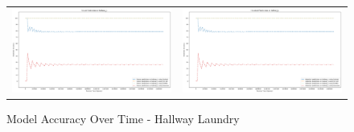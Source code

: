 \begin{figure}
  \begin{tabular}{cc}
    {\includegraphics[width = 3in]{images/results/Future_Predictions_on_hallway_L.png}} &
    {\includegraphics[width = 3in]{images/results/Historical_Predictions_on_hallway_L.png}} \\
  \end{tabular}
  \caption{Model Accuracy Over Time - Hallway Laundry}
\end{figure}

